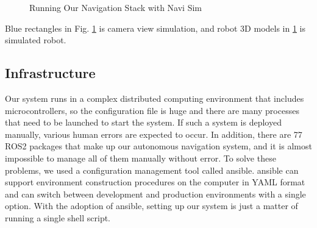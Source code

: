 \documentclass[lettersize,journal]{IEEEtran}
\begin{document}
\begin{figure}[H]
    \begin{center}
    \end{center}
    \caption{Running Our Navigation Stack with Navi Sim}
    \label{fig:navi_sim}
\end{figure}

Blue rectangles in Fig. \ref{fig:navi_sim} is camera view simulation, and robot 3D models in \ref{fig:navi_sim} is simulated robot.

\subsection{Infrastructure}
Our system runs in a complex distributed computing environment that includes microcontrollers,
so the configuration file is huge and there are many processes that need to be launched to start the system.
If such a system is deployed manually, various human errors are expected to occur.
In addition, there are 77 ROS2 packages that make up our autonomous navigation system,
and it is almost impossible to manage all of them manually without error.
To solve these problems, we used a configuration management tool called ansible.
ansible can support environment construction procedures on the computer in YAML format and
can switch between development and production environments with a single option.
With the adoption of ansible, setting up our system is just a matter of running a single shell script.
\end{document}
